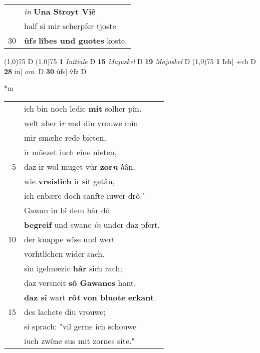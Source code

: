 \documentclass[8pt,a4paper,notitlepage]{article}
\begin{document}
\begin{table}[ht]
\begin{minipage}[t]{0.5\linewidth}
\begin{tabular}{rl}
 & \textit{in} \textbf{Una Stroyt Viê}\\ 
 & half si mir scherpfer tjoste\\ 
30 & \textbf{ûf}\textit{\textbf{s}} \textbf{lîbes und guotes} koste.\\ 
\end{tabular}
\scriptsize
\line(1,0){75} \newline
D \newline
\line(1,0){75} \newline
\textbf{1} \textit{Initiale} D  \textbf{15} \textit{Majuskel} D  \textbf{19} \textit{Majuskel} D  \newline
\line(1,0){75} \newline
\textbf{1} Ich] ÷ch D \textbf{28} in] \textit{om.} D \textbf{30} ûfs] v̂fz D \newline
\end{minipage}
\hspace{0.5cm}
\begin{minipage}[t]{0.5\linewidth}
\small
\begin{center}*m
\end{center}
\begin{tabular}{rl}
 & ich bin noch ledic \textbf{mit} solher pîn.\\ 
 & welt aber i\textit{r} \textit{u}nd diu vrouwe mîn\\ 
 & mir smæhe rede bieten,\\ 
 & ir müezet iuch eine nieten,\\ 
5 & daz ir wol muget vür \textbf{zor\textit{n}} \textit{h}ân.\\ 
 & wie \textbf{vreislîch} ir sît getân,\\ 
 & ich enbære doch sanfte iuwer drô."\\ 
 & Gawan in bî dem hâr dô\\ 
 & \textbf{begreif} und swanc \textit{in} under daz pfert.\\ 
10 & der knappe wîse und wert\\ 
 & vorhtlîchen wider sach.\\ 
 & sîn igelmæzic \textbf{hâr} sich rach;\\ 
 & daz versneit \textbf{sô Gawanes} hant,\\ 
 & \textbf{daz si} wart \textbf{rô\textit{t} von bluote} \textbf{erkant}.\\ 
15 & des lachete diu vrouwe;\\ 
 & si sprach: "vil gerne ich schouwe\\ 
 & iuch zwêne sus mit zornes site."\\ 

\end{tabular}
\end{minipage}
\end{table}
\end{document}
